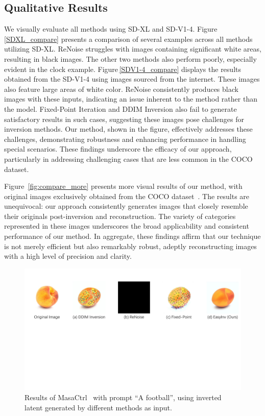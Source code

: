 \documentclass[letterpaper]{article} %
\begin{document}
\subsection{Qualitative Results}
\label{sec:qualitative}
%
We visually evaluate all methods using SD-XL and SD-V1-4. Figure\,\ref{SDXL_compare} presents a comparison of several examples across all methods utilizing SD-XL. ReNoise struggles with images containing significant white areas, resulting in black images. The other two methods also perform poorly, especially evident in the clock example.
%
Figure\,\ref{SDV1-4_compare} displays the results obtained from the SD-V1-4 using images sourced from the internet. These images also feature large areas of white color. ReNoise consistently produces black images with these inputs, indicating an issue inherent to the method rather than the model. Fixed-Point Iteration and DDIM Inversion also fail to generate satisfactory results in such cases, suggesting these images pose challenges for inversion methods. Our method, shown in the figure, effectively addresses these challenges, demonstrating robustness and enhancing performance in handling special scenarios.
%
These findings underscore the efficacy of our approach, particularly in addressing challenging cases that are less common in the COCO dataset. 




Figure~\ref{fig:compare_more} presents more visual results of our method, with original images exclusively obtained from the COCO dataset~\cite{COCO}. The results are unequivocal: our approach consistently generates images that closely resemble their originals post-inversion and reconstruction. The variety of categories represented in these images underscores the broad applicability and consistent performance of our method. In aggregate, these findings affirm that our technique is not merely efficient but also remarkably robust, adeptly reconstructing images with a high level of precision and clarity.


\begin{figure}[!t]
    \centering
    \includegraphics[width=0.98\linewidth]{visual_masa_cut.pdf}
    \caption{Results of MasaCtrl~\cite{cao_2023_masactrl} with prompt ``A football'', using inverted latent generated by different methods as input.}
    \label{masa_compare}
\end{figure}
\end{document}
